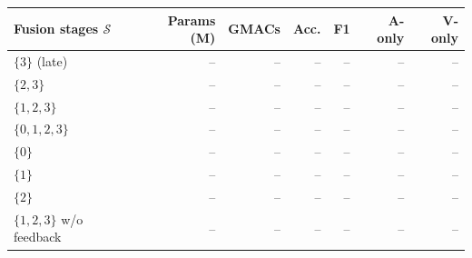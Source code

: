 \begin{tabular}{lrrrrrr}
\toprule
Fusion stages $\mathcal{S}$ & Params (M) & GMACs & Acc. & F1 & A-only & V-only \\
\midrule
$\{3\}$ (late) & -- & -- & -- & -- & -- & -- \\
$\{2,3\}$ & -- & -- & -- & -- & -- & -- \\
$\{1,2,3\}$ & -- & -- & -- & -- & -- & -- \\
$\{0,1,2,3\}$ & -- & -- & -- & -- & -- & -- \\
\midrule
$\{0\}$ & -- & -- & -- & -- & -- & -- \\
$\{1\}$ & -- & -- & -- & -- & -- & -- \\
$\{2\}$ & -- & -- & -- & -- & -- & -- \\
\midrule
$\{1,2,3\}$ w/o feedback & -- & -- & -- & -- & -- & -- \\
\bottomrule
\end{tabular}
